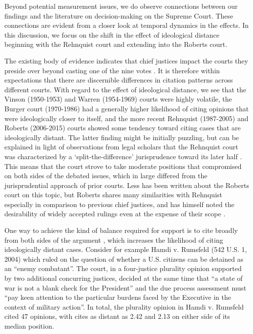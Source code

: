 \documentclass{cup-pan}
\begin{document}
Beyond potential measurement issues, we do observe connections between our findings and the literature on decision-making on the Supreme Court. These connections are evident from a closer look at temporal dynamics in the effects. In this discussion, we focus on the shift in the effect of ideological distance beginning with the Rehnquist court and extending into the Roberts court. 

The existing body of evidence indicates that chief justices impact the courts they preside over beyond casting one of the nine votes \citep{cross2005decisional,danelski2016chief}. It is therefore within expectations that there are discernible differences in citation patterns across different courts. With regard to the effect of ideological distance, we see that the Vinson (1950-1953) and Warren (1954-1969) courts were highly volatile, the Burger court (1970-1986) had a generally higher likelihood of citing opinions that were ideologically closer to itself, and the more recent Rehnquist (1987-2005) and Roberts (2006-2015) courts showed some tendency toward citing cases that are ideologically distant. The latter finding might be initially puzzling, but can be explained in light of observations from legal scholars that the Rehnquist court was characterized by a `split-the-difference' jurisprudence toward its later half \citep{wilkinson2005rehnquist,basiak2006roberts}. This means that the court strove to take moderate positions that compromised on both sides of the debated issues, which in large differed from the jurisprudential approach of prior courts. Less has been written about the Roberts court on this topic, but Roberts shares many similarities with Rehnquist especially in comparison to previous chief justices, and has himself noted the desirability of widely accepted rulings even at the expense of their scope \citep{pomerance2018center,sunstein2008trimming}.

One way to achieve the kind of balance required for support is to cite broadly from both sides of the argument \citep{wilkinson2005rehnquist}, which increases the likelihood of citing ideologically distant cases. Consider for example Hamdi v. Rumsfeld (542 U.S. 1, 2004) which ruled on the question of whether a U.S. citizens can be detained as an ``enemy combatant''. The court, in a four-justice plurality opinion supported by two additional concurring justices, decided at the same time that ``a state of war is not a blank check for the President'' and the due process assessment must ``pay keen attention to the particular burdens faced by the Executive in the context of military action''. In total, the plurality opinion in Hamdi v. Rumsfeld cited 47 opinions, with cites as distant as 2.42 and 2.13 on either side of its median position.
\end{document}
